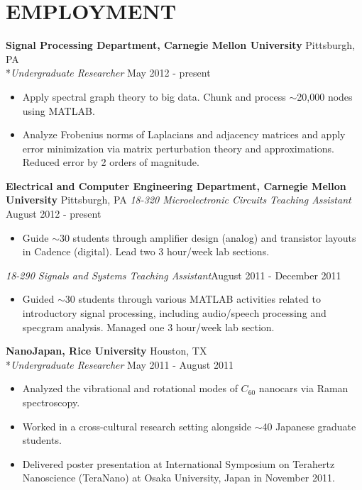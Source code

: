 \documentclass{res}
\begin{document}
\vspace{-0.1in}
\section{EMPLOYMENT}
\vspace{0.05in} 
 
 {\bf Signal Processing Department, Carnegie Mellon University} \hfill Pittsburgh, PA
    \\*\emph{Undergraduate Researcher} \hfill May 2012 - present
\begin{itemize}
    \item Apply spectral graph theory to big data. Chunk and process $\sim$20,000 nodes using MATLAB.
    \item Analyze Frobenius norms of Laplacians and adjacency matrices and apply error minimization via matrix perturbation theory and approximations. Reduced error by 2 orders of magnitude.
\end{itemize}
    
    
 {\bf Electrical and Computer Engineering Department, Carnegie Mellon University} \hfill Pittsburgh, PA
    \emph{18-320 Microelectronic Circuits Teaching Assistant} \hfill August 2012 - present
\begin{itemize}
    \item Guide $\sim$30 students through amplifier design (analog) and transistor layouts in Cadence (digital). Lead two 3 hour/week lab sections. 
\end{itemize}     
    \emph{18-290 Signals and Systems Teaching Assistant}\hfill August 2011 - December 2011
\begin{itemize}
    \item Guided $\sim$30 students through various MATLAB activities related to introductory signal processing, including audio/speech processing and specgram analysis. Managed one 3 hour/week lab section. 
\end{itemize}
 
    {\bf NanoJapan, Rice University} \hfill Houston, TX
    \\*\emph{Undergraduate Researcher} \hfill May 2011 - August 2011
\begin{itemize}
    \item Analyzed the vibrational and rotational modes of $C_{60}$ nanocars via Raman spectroscopy.
    \item Worked in a cross-cultural research setting alongside $\sim$40 Japanese graduate students.
    \item Delivered poster presentation at International Symposium on Terahertz Nanoscience (TeraNano) at Osaka University, Japan in November 2011.
\end{itemize}
    
\end{document}
